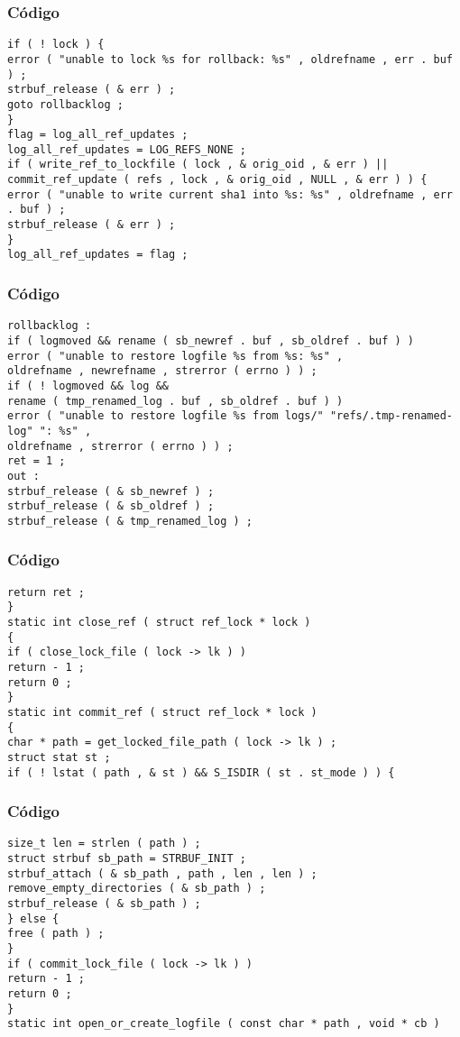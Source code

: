 \documentclass{beamer}
\begin{document}
\begin{frame}[fragile]
\frametitle{C\'odigo}
\begin{verbatim}
if ( ! lock ) { 
error ( "unable to lock %s for rollback: %s" , oldrefname , err . buf ) ; 
strbuf_release ( & err ) ; 
goto rollbacklog ; 
} 
flag = log_all_ref_updates ; 
log_all_ref_updates = LOG_REFS_NONE ; 
if ( write_ref_to_lockfile ( lock , & orig_oid , & err ) || 
commit_ref_update ( refs , lock , & orig_oid , NULL , & err ) ) { 
error ( "unable to write current sha1 into %s: %s" , oldrefname , err . buf ) ; 
strbuf_release ( & err ) ; 
} 
log_all_ref_updates = flag ; 
\end{verbatim}
\end{frame}
\begin{frame}[fragile]
\frametitle{C\'odigo}
\begin{verbatim}
rollbacklog : 
if ( logmoved && rename ( sb_newref . buf , sb_oldref . buf ) ) 
error ( "unable to restore logfile %s from %s: %s" , 
oldrefname , newrefname , strerror ( errno ) ) ; 
if ( ! logmoved && log && 
rename ( tmp_renamed_log . buf , sb_oldref . buf ) ) 
error ( "unable to restore logfile %s from logs/" "refs/.tmp-renamed-log" ": %s" , 
oldrefname , strerror ( errno ) ) ; 
ret = 1 ; 
out : 
strbuf_release ( & sb_newref ) ; 
strbuf_release ( & sb_oldref ) ; 
strbuf_release ( & tmp_renamed_log ) ; 
\end{verbatim}
\end{frame}
\begin{frame}[fragile]
\frametitle{C\'odigo}
\begin{verbatim}
return ret ; 
} 
static int close_ref ( struct ref_lock * lock ) 
{ 
if ( close_lock_file ( lock -> lk ) ) 
return - 1 ; 
return 0 ; 
} 
static int commit_ref ( struct ref_lock * lock ) 
{ 
char * path = get_locked_file_path ( lock -> lk ) ; 
struct stat st ; 
if ( ! lstat ( path , & st ) && S_ISDIR ( st . st_mode ) ) { 
\end{verbatim}
\end{frame}
\begin{frame}[fragile]
\frametitle{C\'odigo}
\begin{verbatim}
size_t len = strlen ( path ) ; 
struct strbuf sb_path = STRBUF_INIT ; 
strbuf_attach ( & sb_path , path , len , len ) ; 
remove_empty_directories ( & sb_path ) ; 
strbuf_release ( & sb_path ) ; 
} else { 
free ( path ) ; 
} 
if ( commit_lock_file ( lock -> lk ) ) 
return - 1 ; 
return 0 ; 
} 
static int open_or_create_logfile ( const char * path , void * cb ) 
\end{verbatim}
\end{frame}
\end{document}
